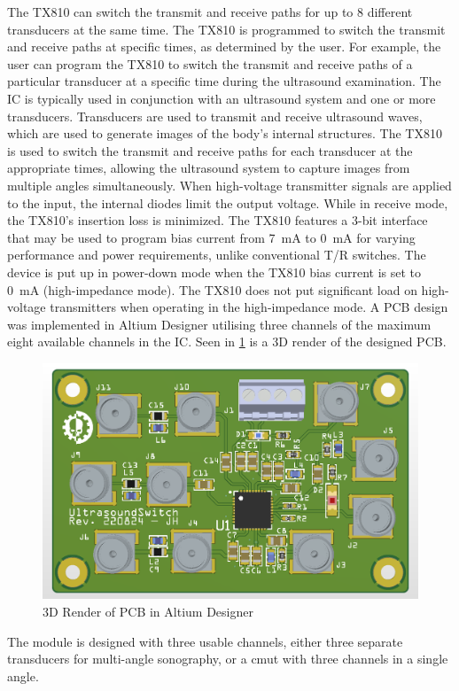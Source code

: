 The TX810 can switch the transmit and receive paths for up to 8 different transducers at the same time. The TX810 is programmed to switch the transmit and receive paths at specific times, as determined by the user. For example, the user can program the TX810 to switch the transmit and receive paths of a particular transducer at a specific time during the ultrasound examination. The IC is typically used in conjunction with an ultrasound system and one or more transducers. Transducers are used to transmit and receive ultrasound waves, which are used to generate images of the body's internal structures. The TX810 is used to switch the transmit and receive paths for each transducer at the appropriate times, allowing the ultrasound system to capture images from multiple angles simultaneously. When high-voltage transmitter signals are applied to the input, the internal diodes limit the output voltage. While in receive mode, the TX810's insertion loss is minimized. The TX810 features a 3-bit interface that may be used to program bias current from \qty{7}{\milli\ampere} to \qty{0}{\milli\ampere} for varying performance and power requirements, unlike conventional T/R switches. The device is put up in power-down mode when the TX810 bias current is set to \qty{0}{\milli\ampere} (high-impedance mode). The TX810 does not put significant load on high-voltage transmitters when operating in the high-impedance mode. A PCB design was implemented in Altium Designer\cite{altium} utilising three channels of the maximum eight available channels in the IC. Seen in \cref{fig:3_ultrasoundswitch} is a 3D render of the designed PCB.
\begin{figure}[htbp]
	\centering
	\includegraphics[width=.8\textwidth]{Figures/3_ultrasoundswitch.png}
	\caption{3D Render of PCB in Altium Designer}
	\label{fig:3_ultrasoundswitch}
\end{figure}
The module is designed with three usable channels, either three separate transducers for multi-angle sonography, or a \gls{cmut} with three channels in a single angle.

